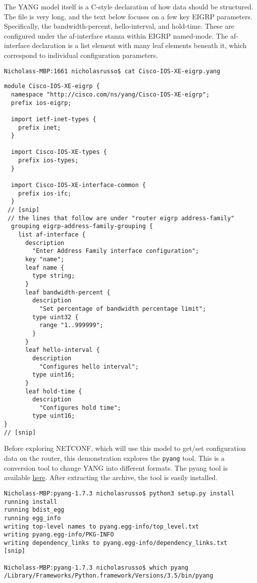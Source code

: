 The YANG model itself is a C-style declaration of how data should be
structured. The file is very long, and the text below focuses on a few key
EIGRP parameters. Specifically, the bandwidth-percent, hello-interval, and
hold-time. These are configured under the af-interface stanza within EIGRP
named-mode. The af-interface declaration is a list element with many leaf
elements beneath it, which correspond to individual configuration parameters.

\begin{verbatim}
Nicholass-MBP:1661 nicholasrusso$ cat Cisco-IOS-XE-eigrp.yang
\end{verbatim}

\begin{verbatim}
module Cisco-IOS-XE-eigrp {
  namespace "http://cisco.com/ns/yang/Cisco-IOS-XE-eigrp";
  prefix ios-eigrp;

  import ietf-inet-types {
    prefix inet;
  }

  import Cisco-IOS-XE-types {
    prefix ios-types;
  }

  import Cisco-IOS-XE-interface-common {
    prefix ios-ifc;
  }
 // [snip]
 // the lines that follow are under "router eigrp address-family"
  grouping eigrp-address-family-grouping {
    list af-interface {
      description
        "Enter Address Family interface configuration";
      key "name";
      leaf name {
        type string;
      }
      leaf bandwidth-percent {
        description
          "Set percentage of bandwidth percentage limit";
        type uint32 {
          range "1..999999";
        }
      }
      leaf hello-interval {
        description
          "Configures hello interval";
        type uint16;
      }
      leaf hold-time {
        description
          "Configures hold time";
        type uint16;
}
// [snip]
\end{verbatim}

Before exploring NETCONF, which will use this model to get/set configuration
data on the router, this demonstration explores the \verb|pyang| tool. This is a
conversion tool to change YANG into different formats. The pyang tool is
available \href{https://pypi.python.org/pypi/pyang}{here}. After extracting the
archive, the tool is easily installed.

\begin{verbatim}
Nicholass-MBP:pyang-1.7.3 nicholasrusso$ python3 setup.py install
running install
running bdist_egg
running egg_info
writing top-level names to pyang.egg-info/top_level.txt
writing pyang.egg-info/PKG-INFO
writing dependency_links to pyang.egg-info/dependency_links.txt
[snip]

Nicholass-MBP:pyang-1.7.3 nicholasrusso$ which pyang
/Library/Frameworks/Python.framework/Versions/3.5/bin/pyang
\end{verbatim}

